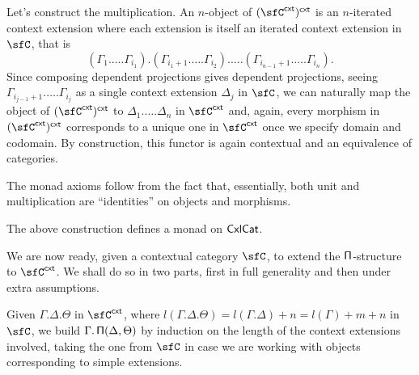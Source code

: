 \begin{construction}
  Let's construct the multiplication. An $n$-object of $(\sfC^{\cxt})^{\cxt}$ is an
  $n$-iterated context extension where each extension is itself an iterated
  context extension in $\sfC$, that is
  \[(\Gamma_1.\ldots.\Gamma_{i_1}).(\Gamma_{i_1+1}.\ldots.\Gamma_{i_2}).\ldots.(\Gamma_{i_{n-1}+1}.\ldots.\Gamma_{i_n}).\]
  Since composing dependent projections gives dependent projections,
  seeing $\Gamma_{i_{j-1}+1}.\ldots.\Gamma_{i_j}$ as a single context extension
  $\Delta_j$ in $\sfC$, we can naturally
  map the object of $(\sfC^{\cxt})^{\cxt}$ to $\Delta_1.\ldots.\Delta_n$ in
  $\sfC^{\cxt}$ and, again, every morphism
  in $(\sfC^{\cxt})^{\cxt}$ corresponds to a unique one in $\sfC^{\cxt}$ once we
  specify domain and codomain. By construction, this functor is again contextual
  and an equivalence of categories.

  The monad axioms follow from the fact that, essentially, both unit and
  multiplication are ``identities'' on objects and morphisms.
\end{construction}

\begin{prop}
  The above construction defines a monad on $\operatorname{\mathsf{CxlCat}}$.
\end{prop}

We are now ready, given a contextual category $\sfC$, to extend the
$\operatorname{\mathsf{\Pi}}$-structure to $\sfC^{\cxt}$. We shall do so in two parts, first in full
generality and then under extra assumptions.

Given $\Gamma.\Delta.\Theta$ in $\sfC^{\cxt}$, where
$l(\Gamma.\Delta.\Theta)=l(\Gamma.\Delta)+n=l(\Gamma)+m+n$ in $\sfC$, we
build $\Gamma.\operatorname{\mathsf{\Pi}}(\Delta,\Theta)$ by induction on the length of the context
extensions involved, taking the
one from $\sfC$ in case we are working with objects corresponding to simple
extensions.

